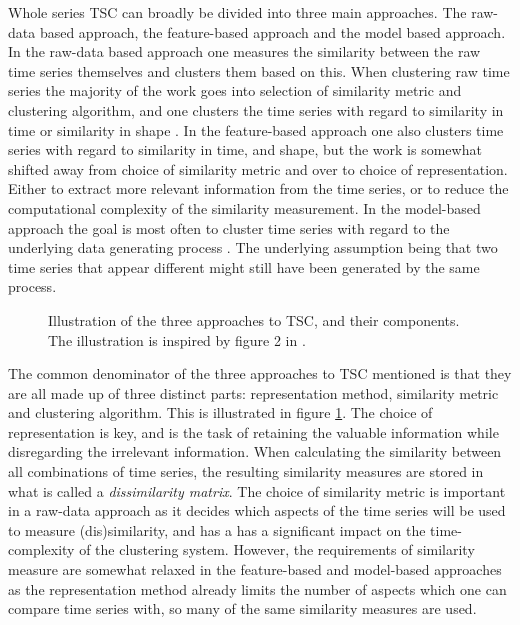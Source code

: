 Whole series TSC can broadly be divided into three main approaches. 
The raw-data based approach, the feature-based approach and the model based approach. 
In the raw-data based approach one measures the similarity between the raw time series themselves and clusters them based on this. 
When clustering raw time series the majority of the work goes into selection of similarity metric and clustering algorithm, and one clusters the time series with regard to similarity in time or similarity in shape \cite{tsc_rev}. 
In the feature-based approach one also clusters time series with regard to similarity in time, and shape, but the work is somewhat shifted away from choice of similarity metric and over to choice of representation. 
Either to extract more relevant information from the time series, or to reduce the computational complexity of the similarity measurement. 
In the model-based approach the goal is most often to cluster time series with regard to the underlying data generating process \cite{moar_mpl_tsc}.
The underlying assumption being that two time series that appear different might still have been generated by the same process.

\begin{figure}
    \begin{center}
    
    \end{center}
    \caption{Illustration of the three approaches to TSC, and their components. The illustration is inspired by figure 2 in \textcite{tsc_rev}.}
    \label{fig:tsc_approaches}
\end{figure}

The common denominator of the three approaches to TSC mentioned is that they are all made up of three distinct parts: representation method, similarity metric and clustering algorithm. 
This is illustrated in figure \ref{fig:tsc_approaches}.
The choice of representation is key, and is the task of retaining the valuable information while disregarding the irrelevant information. 
When calculating the similarity between all combinations of time series, the resulting similarity measures are stored in what is called a \textit{dissimilarity matrix}.
The choice of similarity metric is important in a raw-data approach as it decides which aspects of the time series will be used to measure (dis)similarity, and has a has a significant impact on the time-complexity of the clustering system. 
However, the requirements of similarity measure are somewhat relaxed in the feature-based and model-based approaches as the representation method already limits the number of aspects which one can compare time series with, so many of the same similarity measures are used.

